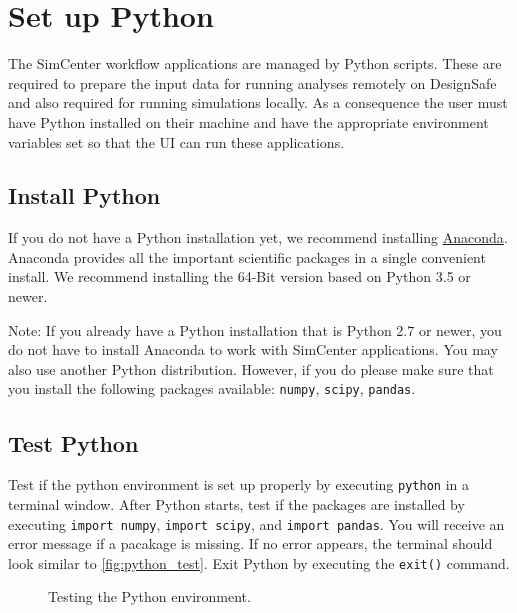 \section{Set up Python}

The SimCenter workflow applications are managed by Python
scripts. These are required to prepare the input data for running
analyses remotely on DesignSafe and also required for running
simulations locally. As a consequence the user must have Python
installed on their machine and have the appropriate environment
variables set so that the UI can run these applications.

\subsection{Install Python}

If you do not have a Python installation yet, we recommend
installing \href{http://www.anaconda.com/distribution/#download-section}{Anaconda}. Anaconda
provides all the important scientific packages in a single convenient
install. We recommend installing the 64-Bit version based on Python
3.5 or newer.

Note: If you already have a Python installation that is Python 2.7 or
newer, you do not have to install Anaconda to work with SimCenter
applications. You may also use another Python distribution. However,
if you do please make sure that you install the following packages
available: \texttt{numpy}, \texttt{scipy}, \texttt{pandas}.

\subsection{Test Python}

Test if the python environment is set up properly by
executing \texttt{python} in a terminal window. After Python starts,
test if the packages are installed by executing \texttt{import
numpy}, \texttt{import scipy}, and \texttt{import pandas}. You will
receive an error message if a pacakage is missing. If no error
appears, the terminal should look similar
to \autoref{fig:python_test}. Exit Python by executing
the \texttt{exit()} command.

\begin{figure}[!htbp]
  \caption{Testing the Python environment.}
  \label{fig:python_test}
\end{figure}

